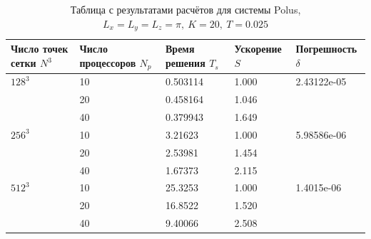 \documentclass[oneside, final, 12pt]{extarticle}
\begin{document}
\begin{table}[H]
    \centering
    \begin{tabular}{|l|l|l|l|l|}
        \hline
        \makecell{Число точек \\сетки $ N^3 $} & \makecell{Число \\процессоров $ N_p $} & \makecell{Время \\решения $ T_s $} & Ускорение $ S $ & Погрешность $ \delta $ \\
        \hline
        $ 128^3 $                 & 10               & 0.503114 & 1.000  & 2.43122e-05 \\
        \cline{2-4}
                              & 20               & 0.458164 & 1.046  & \\
        \cline{2-4}
                              & 40              & 0.379943 & 1.649 & \\
        \hline
        $ 256^3 $                 & 10               & 3.21623 & 1.000  & 5.98586e-06 \\
        \cline{2-4}
                              & 20               & 2.53981 & 1.454  & \\
        \cline{2-4}
                              & 40              & 1.67373 & 2.115 & \\
        \hline
        $ 512^3 $                 & 10               & 25.3253 & 1.000  & 1.4015e-06 \\
        \cline{2-4}
                              & 20               & 16.8522 & 1.520 & \\
        \cline{2-4}
                              & 40              & 9.40066 & 2.508 & \\
        \hline
    \end{tabular}
    \caption{Таблица с результатами расчётов для системы Polus, $ L_x = L_y = L_z = \pi, \: K = 20, \: T = 0.025 $}
\end{table}
\end{document}
